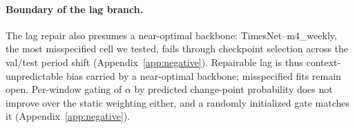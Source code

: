\paragraph{Boundary of the lag branch.}
The lag repair also presumes a near-optimal backbone: TimesNet--m4\_weekly, the most misspecified cell we tested, fails through checkpoint selection across the val/test period shift (Appendix~\ref{app:negative}). Repairable lag is thus context-unpredictable bias carried by a near-optimal backbone; misspecified fits remain open. Per-window gating of $\alpha$ by predicted change-point probability does not improve over the static weighting either, and a randomly initialized gate matches it (Appendix~\ref{app:negative}).
